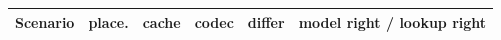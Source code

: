 \begin{tabular}{lrrrrr}
\toprule
Scenario & place. & cache & codec & differ & model right / lookup right \\
\midrule
\bottomrule
\end{tabular}
